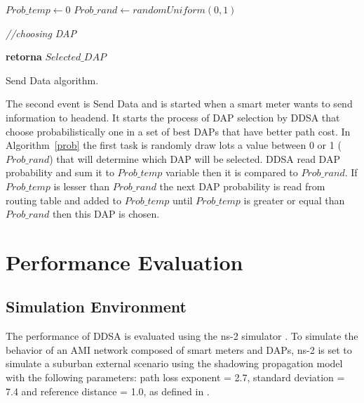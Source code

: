 \documentclass[conference]{IEEEtran}
\begin{document}
\IncMargin{1em}
\begin{algorithm}



 $Prob\_temp \leftarrow 0$
 $ Prob\_rand \leftarrow randomUniform(0,1)$

\emph{//choosing DAP }


 \textbf{retorna} $ Selected\_DAP $

\BlankLine
\caption{Send Data algorithm.}
\label{prob}
\end{algorithm}\DecMargin{1em}

The second event is Send Data and is started when a smart meter wants to send information to headend. It starts the process of DAP selection by DDSA that choose probabilistically one in a set of best DAPs that have better path cost. In Algorithm~\ref{prob} the first task is randomly draw lots a value between 0 or 1 ($Prob\_rand$) that will determine which DAP  will be selected. DDSA read DAP probability and sum it to $Prob\_temp$ variable then it is compared to $Prob\_rand$. If $Prob\_temp$ is lesser than $Prob\_rand$ the next DAP probability is read from routing table and added to $Prob\_temp$ until  $Prob\_temp$ is greater or equal than $Prob\_rand$ then this DAP is chosen. 



\section{Performance Evaluation}




\subsection{Simulation Environment}  

The performance of DDSA is evaluated using the ns-2 simulator \cite{ns-2:13}. 
To simulate the behavior of an AMI network composed of  smart meters and DAPs, ns-2 is set to simulate a suburban external scenario using the shadowing propagation model with the following parameters: path loss exponent = 2.7, standard deviation = 7.4 and reference distance = 1.0, as defined in \cite{Plan2011}.
\end{document}
